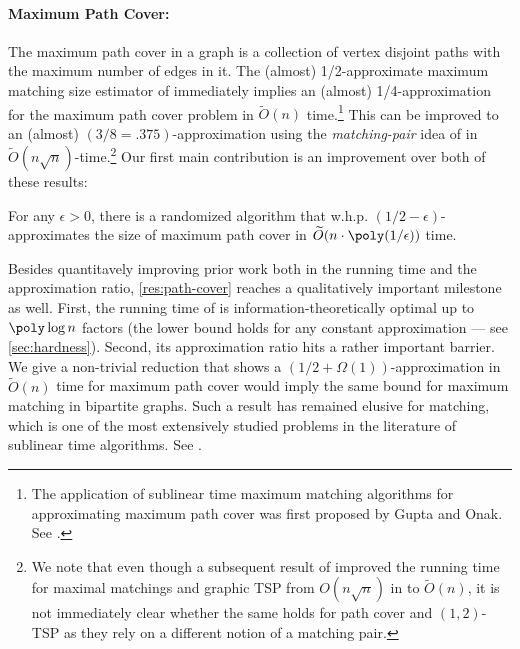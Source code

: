 \paragraph{Maximum Path Cover:}  The maximum path cover in a graph is a collection of vertex disjoint paths with the maximum number of edges in it. The (almost) 1/2-approximate maximum matching size estimator of \citet*{behnezhad2021} immediately implies an (almost) 1/4-approximation for the maximum path cover problem in $\widetilde{O}(n)$ time.\footnote{The application of sublinear time maximum matching algorithms for approximating maximum path cover was first proposed by Gupta and Onak. See \cite{sublinear-info}.} This can be improved to an (almost) $(3/8 = .375)$-approximation using the {\em matching-pair} idea of \citet*{chen2020} in $\widetilde{O}(n \sqrt{n})$-time.\footnote{We note that even though a subsequent result of \citet*{behnezhad2021} improved the running time for maximal matchings and graphic TSP from $O(n\sqrt{n})$ in \cite{chen2020} to $\widetilde{O}(n)$, it is not immediately clear whether the same holds for path cover and $(1,2)$-TSP as they rely on a different notion of a matching pair.} Our first main contribution is an improvement over both of these results:

\begin{graytbox}
\begin{result}\label{res:path-cover}
    For any $\epsilon > 0$, there is a randomized algorithm that w.h.p. $(1/2-\epsilon)$-approximates the size of maximum path cover in $\widetilde{O}(n \cdot \poly(1/\epsilon))$ time.
\end{result}
\end{graytbox}

Besides quantitavely improving prior work both in the running time and the approximation ratio, \cref{res:path-cover} reaches a qualitatively important milestone as well. First, the running time of  is information-theoretically optimal up to $\poly\log n$ factors (the lower bound holds for any constant approximation --- see \cref{sec:hardness}). Second, its approximation ratio hits a rather important barrier. We give a non-trivial reduction that shows a $(1/2+\Omega(1))$-approximation in $\widetilde{O}(n)$ time for maximum path cover would imply the same bound for maximum matching in bipartite graphs. Such a result has remained elusive for matching, which is one of the most extensively studied problems in the literature of sublinear time algorithms. See .

